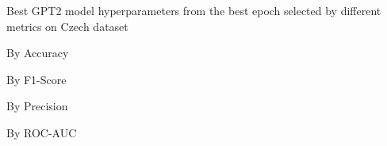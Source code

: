 \begin{table}[!htbp]
    \caption{Best GPT2 model hyperparameters from the best epoch selected by different metrics on Czech dataset}
    \label{tab:czech_gpt2_hparams}
    \centering

    \begin{subtable}[t]{0.48\linewidth}
        \scriptsize
        \caption{By Accuracy}
        
    \end{subtable}
    \hfill
    \begin{subtable}[t]{0.48\linewidth}
        \scriptsize
        \caption{By F1-Score}
        
    \end{subtable}

    \vspace{1em}

    \begin{subtable}[t]{0.48\linewidth}
        \scriptsize
        \caption{By Precision}
        
    \end{subtable}
    \hfill
    \begin{subtable}[t]{0.48\linewidth}
        \scriptsize
        \caption{By ROC-AUC}
        
    \end{subtable}


\end{table}